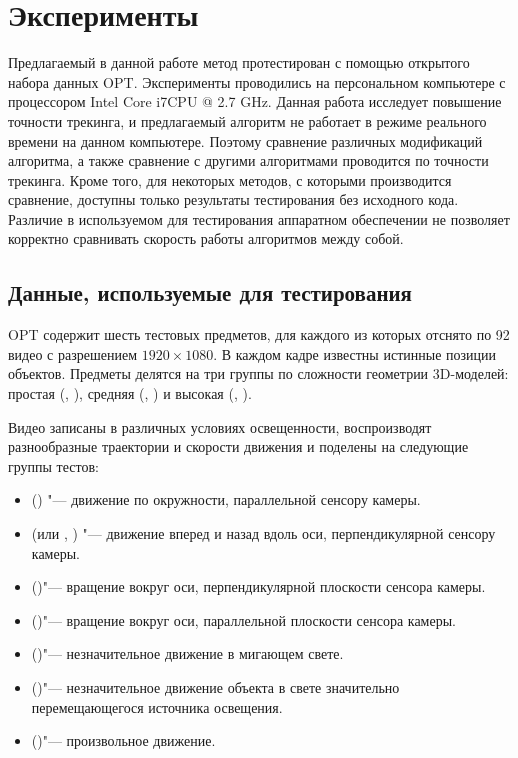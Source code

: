 \section{Эксперименты}\label{experiments}

Предлагаемый в данной работе метод протестирован с помощью открытого набора
данных OPT\cite{OPT}.
Эксперименты проводились на персональном компьютере с процессором Intel Core
i7CPU @ 2.7 GHz.
Данная работа исследует повышение точности трекинга, и предлагаемый алгоритм не
работает в режиме реального времени на данном компьютере.
Поэтому сравнение различных модификаций алгоритма, а также сравнение с другими
алгоритмами проводится по точности трекинга.
Кроме того, для некоторых методов, с которыми производится сравнение,
доступны только результаты тестирования без исходного кода.
Различие в используемом для тестирования аппаратном обеспечении не позволяет
корректно сравнивать скорость работы алгоритмов между собой.

\subsection{Данные, используемые для тестирования}

OPT содержит шесть тестовых предметов, для каждого из которых отснято
по 92 видео с разрешением $1920\times1080$.
В каждом кадре известны истинные позиции объектов.
Предметы делятся на три группы по сложности геометрии 3D-моделей: простая
(, ), средняя (, )
и высокая (, ).

Видео записаны в различных условиях освещенности, воспроизводят разнообразные
траектории и скорости движения и поделены на следующие группы тестов:
\begin{itemize}
\item {} () "--- движение по окружности,
параллельной
        сенсору камеры.
\item {} (или , ) "--- движение вперед
и
        назад вдоль оси, перпендикулярной сенсору камеры.
\item {} ()"--- вращение вокруг оси,
перпендикулярной
        плоскости сенсора камеры.
\item {} ()"--- вращение вокруг оси,
параллельной
        плоскости сенсора камеры.
\item {} ()"--- незначительное движение в мигающем
свете.
\item {} ()"--- незначительное движение объекта в
свете значительно
        перемещающегося источника освещения.
    \item {} ()"--- произвольное движение.
\end{itemize}


